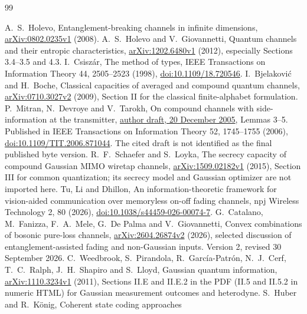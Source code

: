 \documentclass[11pt]{article}
\begin{document}
\begin{thebibliography}{99}\raggedright
{} A.~S.~Holevo, Entanglement-breaking channels in infinite
dimensions, \href{https://arxiv.org/abs/0802.0235v1}{arXiv:0802.0235v1} (2008).
 A.~S.~Holevo and V.~Giovannetti, Quantum channels
and their entropic characteristics,
\href{https://arxiv.org/abs/1202.6480v1}{arXiv:1202.6480v1} (2012),
especially Sections 3.4--3.5 and 4.3.
 I.~Csisz\'ar, The method of types, IEEE Transactions on
Information Theory 44, 2505--2523 (1998),
\href{https://doi.org/10.1109/18.720546}{doi:10.1109/18.720546}.
 I.~Bjelakovi\'c and H.~Boche, Classical capacities of
averaged and compound quantum channels,
\href{https://arxiv.org/abs/0710.3027v2}{arXiv:0710.3027v2} (2009),
Section II for the classical finite-alphabet formulation.
 P.~Mitran, N.~Devroye and V.~Tarokh, On compound
channels with side-information at the transmitter,
\href{https://ece.uwaterloo.ca/~pmitran/compound3.pdf}{author draft,
20 December 2005}, Lemmas 3--5. Published in IEEE Transactions on
Information Theory 52, 1745--1755 (2006),
\href{https://doi.org/10.1109/TIT.2006.871044}{doi:10.1109/TIT.2006.871044}.
The cited draft is not identified as the final published byte version.
 R.~F.~Schaefer and S.~Loyka, The secrecy capacity
of compound Gaussian MIMO wiretap channels,
\href{https://arxiv.org/abs/1509.02182v1}{arXiv:1509.02182v1} (2015),
Section III for common quantization; its secrecy model and Gaussian
optimizer are not imported here.
 Tu, Li and Dhillon, An information-theoretic framework for
vision-aided communication over memoryless on-off fading channels,
npj Wireless Technology 2, 80 (2026),
\href{https://doi.org/10.1038/s44459-026-00074-7}
{doi:10.1038/s44459-026-00074-7}.
 G.~Catalano, M.~Fanizza, F.~A.~Mele,
G.~De Palma and V.~Giovannetti, Convex combinations of bosonic
pure-loss channels,
\href{https://arxiv.org/abs/2604.26874v2}{arXiv:2604.26874v2} (2026),
selected discussion of entanglement-assisted fading and non-Gaussian
inputs. Version 2, revised 30 September 2026.
 C.~Weedbrook, S.~Pirandola,
R.~Garc\'ia-Patr\'on, N.~J.~Cerf, T.~C.~Ralph, J.~H.~Shapiro
and S.~Lloyd, Gaussian quantum information,
\href{https://arxiv.org/abs/1110.3234v1}{arXiv:1110.3234v1} (2011),
Sections II.E and II.E.2 in the PDF (II.5 and II.5.2 in numeric HTML)
for Gaussian measurement outcomes and heterodyne.
 S.~Huber and R.~K\"onig, Coherent state coding approaches

\end{thebibliography}
\end{document}
